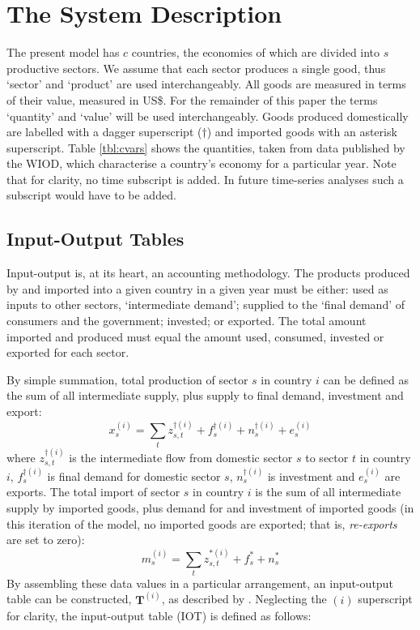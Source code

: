 \documentclass[a4paper]{article}
\begin{document}
\section{The System Description} \label{sec:system}
The present model has $c$ countries, the economies of which are divided into $s$ productive sectors.
We assume that each sector produces a single good, thus `sector' and `product' are used interchangeably.
All goods are measured in terms of their value, measured in US\$.
For the remainder of this paper the terms `quantity' and `value' will be used interchangeably.
Goods produced domestically are labelled with a dagger superscript ($\dagger$) and imported goods with an asterisk superscript.
Table \ref{tbl:cvars} shows the quantities, taken from data published by the WIOD, which characterise a country's economy for a particular year.
Note that for clarity, no time subscript is added. In future time-series analyses such a subscript would have to be added.

\subsection{Input-Output Tables} \label{sec:iots}
Input-output is, at its heart, an accounting methodology.
The products produced by and imported into a given country in a given year must be either: used as inputs to other sectors, `intermediate demand'; supplied to the `final demand' of consumers and the government; invested; or exported.
The total amount imported and produced must equal the amount used, consumed, invested or exported for each sector.

By simple summation, total production of sector $s$ in country $i$ can be defined as the sum of all intermediate supply, plus supply to final demand, investment and export:
\begin{equation}\label{eqn:x}
x_s^{(i)}=\sum\limits_{t}z_{s,t}^{\dagger(i)} + f_s^{\dagger(i)} + n_s^{\dagger(i)} + e_s^{(i)}
\end{equation}
where $z_{s,t}^{\dagger(i)}$ is the intermediate flow from domestic sector $s$ to sector $t$ in country $i$, $f_s^{\dagger(i)}$ is final demand for domestic sector $s$, $n_s^{\dagger(i)}$ is investment and $e_s^{(i)}$ are exports.
The total import of sector $s$ in country $i$ is the sum of all intermediate supply by imported goods, plus demand for and investment of imported goods (in this iteration of the model, no imported goods are exported; that is, \textit{re-exports} are set to zero):
\begin{equation}\label{eqn:m}
m_s^{(i)}=\sum\limits_{t}z_{s,t}^{*(i)} + f_s^* + n_s^*
\end{equation}
By assembling these data values in a particular arrangement, an input-output table can be constructed, $\boldsymbol{T}^{(i)}$, as described by \textcite{Miller1985}.
Neglecting the $(i)$ superscript for clarity, the input-output table (IOT) is defined as follows:
\end{document}
